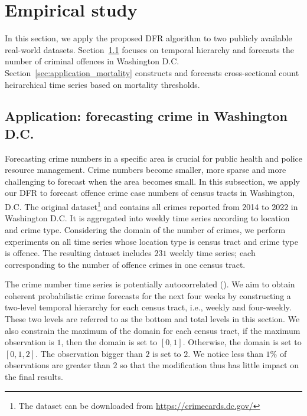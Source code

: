 \documentclass[a4paper,review,12pt,authoryear]{elsarticle}
\begin{document}
     \section{Empirical study}
     \label{sec:application}
     In this section, we apply the proposed DFR algorithm to two publicly available real-world datasets.
     Section~\ref{sec:application_crime} focuses on temporal hierarchy and forecasts the number of criminal offences in Washington D.C. Section~\ref{sec:application_mortality} constructs and forecasts cross-sectional count heirarchical time series based on mortality thresholds. 
     
     \subsection{Application: forecasting crime in Washington D.C.}
     \label{sec:application_crime}
     
     Forecasting crime numbers in a specific area is crucial for public health and police resource management.
     Crime numbers become smaller, more sparse and more challenging to forecast when the area becomes small.
     In this subsection, we apply our DFR to forecast offence crime case numbers of census tracts in Washington, D.C. 
     The original dataset\footnote{The dataset can be downloaded from \url{https://crimecards.dc.gov/}} and contains all crimes reported from 2014 to 2022 in Washington D.C. It is aggregated into weekly time series according to location and crime type. 
     Considering the domain of the number of crimes, we perform experiments on all time series whose location type is census tract and crime type is offence.
     The resulting dataset includes $231$ weekly time series; each corresponding to the number of offence crimes in one census tract.
     
     The crime number time series is potentially autocorrelated (\citealp{aldor-noimanSpatioTemporalLowCount2013}). 
     We aim to obtain coherent probabilistic crime forecasts for the next four weeks by constructing a two-level temporal hierarchy for each census tract, i.e., weekly and four-weekly. 
     These two levels are referred to as the bottom and total levels in this section. 
     We also constrain the maximum of the domain for each census tract, if the maximum observation is $1$, then the domain is set to $[0, 1]$. Otherwise, the domain is set to $[0, 1, 2]$. The observation bigger than $2$ is set to $2$. 
     We notice less than $1\%$ of observations are greater than $2$ so that the modification thus has little impact on the final results.
     
\end{document}
